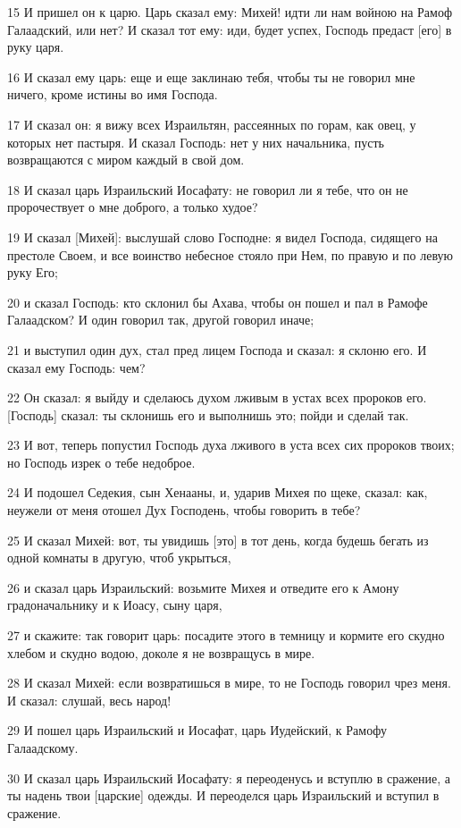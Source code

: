 \par 15 И пришел он к царю. Царь сказал ему: Михей! идти ли нам войною на Рамоф Галаадский, или нет? И сказал тот ему: иди, будет успех, Господь предаст [его] в руку царя.
\par 16 И сказал ему царь: еще и еще заклинаю тебя, чтобы ты не говорил мне ничего, кроме истины во имя Господа.
\par 17 И сказал он: я вижу всех Израильтян, рассеянных по горам, как овец, у которых нет пастыря. И сказал Господь: нет у них начальника, пусть возвращаются с миром каждый в свой дом.
\par 18 И сказал царь Израильский Иосафату: не говорил ли я тебе, что он не пророчествует о мне доброго, а только худое?
\par 19 И сказал [Михей]: выслушай слово Господне: я видел Господа, сидящего на престоле Своем, и все воинство небесное стояло при Нем, по правую и по левую руку Его;
\par 20 и сказал Господь: кто склонил бы Ахава, чтобы он пошел и пал в Рамофе Галаадском? И один говорил так, другой говорил иначе;
\par 21 и выступил один дух, стал пред лицем Господа и сказал: я склоню его. И сказал ему Господь: чем?
\par 22 Он сказал: я выйду и сделаюсь духом лживым в устах всех пророков его. [Господь] сказал: ты склонишь его и выполнишь это; пойди и сделай так.
\par 23 И вот, теперь попустил Господь духа лживого в уста всех сих пророков твоих; но Господь изрек о тебе недоброе.
\par 24 И подошел Седекия, сын Хенааны, и, ударив Михея по щеке, сказал: как, неужели от меня отошел Дух Господень, чтобы говорить в тебе?
\par 25 И сказал Михей: вот, ты увидишь [это] в тот день, когда будешь бегать из одной комнаты в другую, чтоб укрыться,
\par 26 и сказал царь Израильский: возьмите Михея и отведите его к Амону градоначальнику и к Иоасу, сыну царя,
\par 27 и скажите: так говорит царь: посадите этого в темницу и кормите его скудно хлебом и скудно водою, доколе я не возвращусь в мире.
\par 28 И сказал Михей: если возвратишься в мире, то не Господь говорил чрез меня. И сказал: слушай, весь народ!
\par 29 И пошел царь Израильский и Иосафат, царь Иудейский, к Рамофу Галаадскому.
\par 30 И сказал царь Израильский Иосафату: я переоденусь и вступлю в сражение, а ты надень твои [царские] одежды. И переоделся царь Израильский и вступил в сражение.
